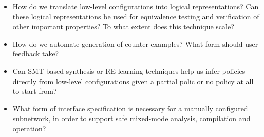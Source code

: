 \begin{itemize}
\item How do we translate low-level configurations into logical representations?  Can these logical representations be used
for equivalence testing and verification of other important properties?  To what extent does this technique scale?

\item How do we automate generation of counter-examples? What form should user feedback take?

\item Can SMT-based synthesis or RE-learning techniques help us infer \Name policies directly from low-level configurations given a partial \Name polic or no \Name policy at all to start from?

\item What form of interface specification is necessary for a manually configured subnetwork, in order to support safe mixed-mode \Name analysis, compilation and operation?

\end{itemize}







